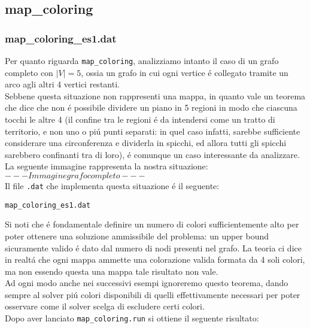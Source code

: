 \documentclass{article}
\begin{document}
\subsection{map\_coloring}
\subsubsection{map\_coloring\_es1.dat}

Per quanto riguarda \texttt{map\_coloring}, analizziamo intanto il caso di un grafo completo con $|V| = 5$, ossia un grafo in cui ogni vertice \'e collegato tramite un arco agli altri 4 vertici restanti. \\
Sebbene questa situazione non rappresenti una mappa, in quanto vale un teorema che dice che non \'e possibile dividere un piano in 5 regioni in modo che ciascuna tocchi le altre 4 (il confine tra le regioni \'e da intendersi come un tratto di territorio, e non uno o pi\'u punti separati: in quel caso infatti, sarebbe sufficiente considerare una circonferenza e dividerla in spicchi, ed allora tutti gli spicchi sarebbero confinanti tra di loro), \'e comunque un caso interessante da analizzare.\\
La seguente immagine rappresenta la nostra situazione:\\

$ --- Immagine grafo completo --- $\\

Il file \texttt{.dat} che implementa questa situazione \'e il seguente:

\vspace{5mm}
\texttt{map\_coloring\_es1.dat}

\vspace{5mm}

Si noti che \'e fondamentale definire un numero di colori sufficientemente alto per poter ottenere una soluzione ammissibile del problema: un upper bound sicuramente valido \'e dato dal numero di nodi presenti nel grafo. La teoria ci dice in realt\'a che ogni mappa ammette una colorazione valida formata da 4 soli colori, ma non essendo questa una mappa tale risultato non vale.\\
Ad ogni modo anche nei successivi esempi ignoreremo questo teorema, dando sempre al solver pi\'u colori disponibili di quelli effettivamente necessari per poter osservare come il solver scelga di escludere certi colori.\\

Dopo aver lanciato \texttt{map\_coloring.run} si ottiene il seguente risultato:\\
\end{document}
